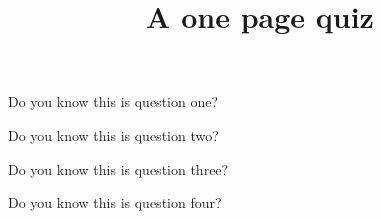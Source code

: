 \documentclass[onepage]{webquiz}
\title{A one page quiz}
\begin{document}
  \begin{question} Do you know this is question one?   \end{question}
  \begin{question} Do you know this is question two?   \end{question}
  \begin{question} Do you know this is question three? \end{question}
  \begin{question} Do you know this is question four?  \end{question}
\end{document}

